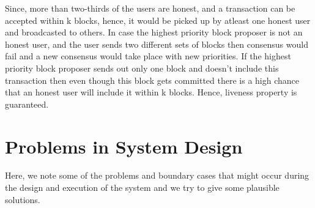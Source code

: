 Since, more than two-thirds of the users are honest, and a transaction can be accepted within k blocks, hence, it would be picked up by atleast one honest user and broadcasted to others. In case the highest priority block proposer is not an honest user, and the user sends two different sets of blocks then consensus would fail and a new consensus would take place with new priorities. If the highest priority block proposer sends out only one block and doesn't include this transaction then even though this block gets committed there is a high chance that an honest user will include it within k blocks. Hence, liveness property is guaranteed.

\section{Problems in System Design}

Here, we note some of the problems and boundary cases that might occur during the design and execution of the system and we try to give some plausible solutions.

